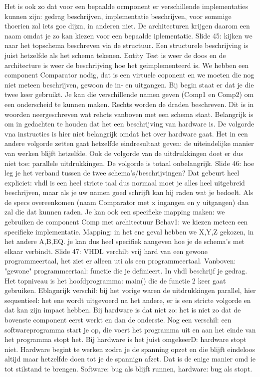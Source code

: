 \documentclass[10pt,a4paper]{book}
\begin{document}
Het is ook zo dat voor een bepaalde ocmponent er verschillende implementaties kunnen zijn: gedrag beschrijven, implementatie beschrijven, voor sommige thoerien zal iets goe dijzn, in anderen niet. De architecturen krijgen daarom een naam omdat je zo kan kiezen voor een bepaalde iplementatie.
Slide 45: kijken we naar het topschema beschreven via de structuur. Een structurele beschrijving is juist hetzelfde als het schema tekenen. Entity Test is weer de doos en de architecture is weer de beschrijving hoe het geimplementeerd is. We hebben een component Comparator nodig, dat is een virtuele coponent en we moeten die nog niet meteen beschrijven, gewoon de in- en uitgangen.
Bij begin staat er dat je die twee keer gebruikt. Je kan die verschillende namen geven (Comp1 en Comp2) om een onderscheid te kunnen maken. Rechts worden de draden beschreven. 
Dit is in woorden neergeschreven wat rehcts vanboven met een schema staat. 
Belangrijk is om in gedachten te houden dat het een beschrijving van hardware is. De volgorde vna instructies is hier niet belangrijk omdat het over hardware gaat. Het in een andere volgorde zetten gaat hetzelfde eindresultaat geven: de uiteindelijke manier van werken blijft hetzelfde. Ook de volgorde van de uitdrukkingen doet er dus niet toe: parallele uitdrukkingen. De volgorde is totaal onbelangrijk.
Slide 46: hoe leg je het verband tussen de twee schema's/beschrijvingen? Dat gebeurt heel expliciet: vhdl is een heel stricte taal dus normaal moet je alles heel uitgebreid beschrijven, maar als je uw namen goed schrijft kan hij raden wat je bedoelt. Als de specs overeenkomen (naam Comparator met x ingangen en y uitgangen) dan zal die dat kunnen raden. Je kan ook een specifieke mapping maken: we gebruiken de component Comp met architectuur Behav1: we kiezen meteen een specifieke implementatie. Mapping: in het ene geval hebben we X,Y,Z gekozen, in het andere A,B,EQ. je kan dus heel specifiek aangeven hoe je de schema's met elkaar verbindt.
Slide 47: VHDL verchilt vrij hard van een gewone programmeertaal, het ziet er alleen uti als een programmeertaal. Vanboven: "gewone" programmeertaal: functie die je definieert. In vhdl beschrijf je gedrag. Het topniveau is het hoofdprogramma: main() die de functie 2 keer gaat gebruiken. Eblagnrijk verschil: bij het vorige waren de uitdrukkingen parallel, hier sequentieel: het ene wordt uitgevoerd na het andere, er is een stricte volgorde en dat kan zijn impact hebben. Bij hardware is dat niet zo: het is niet zo dat de bovenste component eerst werkt en dan de onderste. 
Nog een verschil: een softwareprogramma start je op, die voert het programma uit en aan het einde van het programma stopt het. Bij hardware is het juist omgekeerD: hardware stopt niet. Hardware begint te werken zodra je de spanning opzet en die blijft eindeloos altijd maar hetzelfde doen tot je de spannign afzet. Dat is de enige manier omd ie tot stilstand te brengen. Software: bug als blijft runnen, hardware: bug als stopt.
\end{document}
